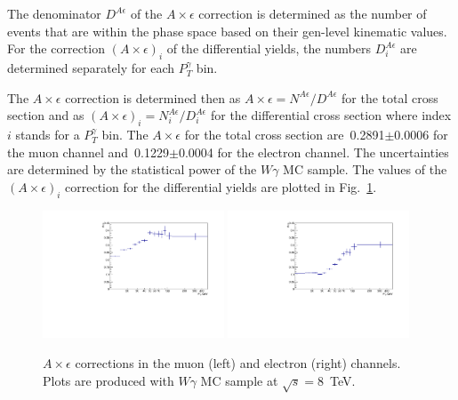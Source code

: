 The denominator $D^{A\epsilon}$ of the $A \times \epsilon$ correction is determined as the number of events that are within the phase space based on their gen-level kinematic values. For the correction $(A \times \epsilon)_i$ of the differential yields, the numbers $D^{A\epsilon}_{i}$ are determined separately for each $P_T^\gamma$ bin.  

The $A \times \epsilon$ correction is determined then as $A \times \epsilon = N^{A\epsilon}/D^{A\epsilon}$ for the total cross section and as $(A \times \epsilon)_i = N^{A\epsilon}_i/{D^{A\epsilon}_i}$ for the differential cross section where index $i$ stands for a $P_T^{\gamma}$ bin. The $A \times \epsilon$ for the total cross section are~0.2891$\pm$0.0006 for the muon channel and~0.1229$\pm$0.0004 for the electron channel. The uncertainties are determined by the statistical power of the $W\gamma$ MC sample. The values of the $(A \times \epsilon)_i$ correction for the differential yields are plotted in Fig.~\ref{fig:accXeff_Wg}.

\begin{figure}[htb]
  \begin{center}
  \includegraphics[width=0.48\textwidth]{../figs/figs_v11/MUON_WGamma/Constants/C_accXeff_MUON_WGamma.pdf}  \includegraphics[width=0.48\textwidth]{../figs/figs_v11/ELECTRON_WGamma/Constants/C_accXeff_ELECTRON_WGamma.pdf}\\
  \label{fig:accXeff_Wg}
  \caption{$A\times\epsilon$ corrections in the muon (left) and electron (right) channels. Plots are produced with $W\gamma$ MC sample at $\sqrt{s}=$8~TeV. }
  \end{center}
\end{figure}

